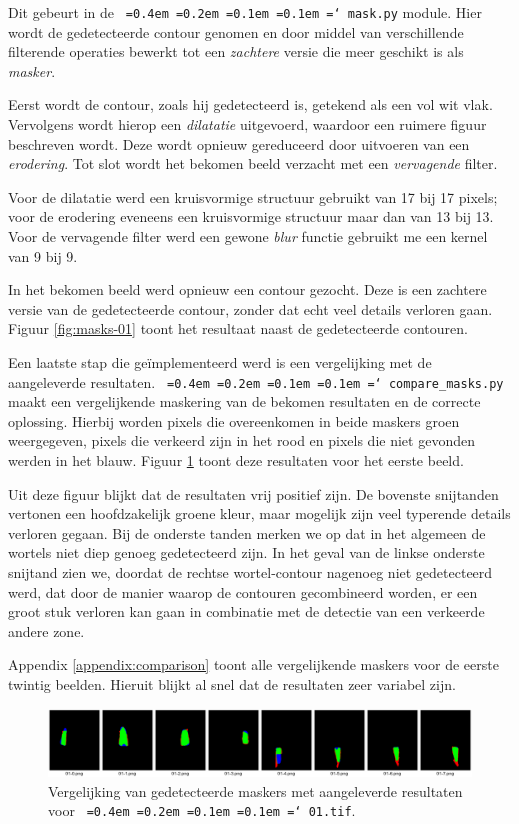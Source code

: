 \documentclass[10pt,a4paper]{article}
\newcommand*\justify{%
  \fontdimen2\font=0.4em%
  \fontdimen3\font=0.2em%
  \fontdimen4\font=0.1em%
  \fontdimen7\font=0.1em%
  \hyphenchar\font=`\-%
}
\newcommand{\ttt}[1]{{\tt \justify{#1}}}
\begin{document}
Dit gebeurt in de \ttt{mask.py} module. Hier wordt de gedetecteerde contour genomen en door middel van verschillende filterende operaties bewerkt tot een \emph{zachtere} versie die meer geschikt is als \emph{masker}. 

Eerst wordt de contour, zoals hij gedetecteerd is, getekend als een vol wit vlak. Vervolgens wordt hierop een \emph{dilatatie} uitgevoerd, waardoor een ruimere figuur beschreven wordt. Deze wordt opnieuw gereduceerd door uitvoeren van een \emph{erodering}. Tot slot wordt het bekomen beeld verzacht met een \emph{vervagende} filter.

Voor de dilatatie werd een kruisvormige structuur gebruikt van 17 bij 17 pixels; voor de erodering eveneens een kruisvormige structuur maar dan van 13 bij 13. Voor de vervagende filter werd een gewone \emph{blur} functie gebruikt me een kernel van 9 bij 9.

In het bekomen beeld werd opnieuw een contour gezocht. Deze is een zachtere versie van de gedetecteerde contour, zonder dat echt veel details verloren gaan. Figuur \ref{fig:masks-01} toont het resultaat  naast de gedetecteerde contouren.

Een laatste stap die ge\"implementeerd werd is een vergelijking met de aangeleverde resultaten. \ttt{compare\_masks.py} maakt een vergelijkende maskering van de bekomen resultaten en de correcte oplossing. Hierbij worden pixels die overeenkomen in beide maskers groen weergegeven, pixels die verkeerd zijn in het rood en pixels die niet gevonden werden in het blauw. Figuur \ref{fig:comparison-01} toont deze resultaten voor het eerste beeld.

Uit deze figuur blijkt dat de resultaten vrij positief zijn. De bovenste snijtanden vertonen een hoofdzakelijk groene kleur, maar mogelijk zijn veel typerende details verloren gegaan. Bij de onderste tanden merken we op dat in het algemeen de wortels niet diep genoeg gedetecteerd zijn. In het geval van de linkse onderste snijtand zien we, doordat de rechtse wortel-contour nagenoeg niet gedetecteerd werd, dat door de manier waarop de contouren gecombineerd worden, er een groot stuk verloren kan gaan in combinatie met de detectie van een verkeerde andere zone.

Appendix \ref{appendix:comparison} toont alle vergelijkende maskers voor de eerste twintig beelden. Hieruit blijkt al snel dat de resultaten zeer variabel zijn.

\begin{figure}
  \centering
  \includegraphics[width=\linewidth]{resources/comparison-01.png}
  \caption{Vergelijking van gedetecteerde maskers met aangeleverde resultaten voor \ttt{01.tif}.}
  \label{fig:comparison-01}
\end{figure}
\end{document}
